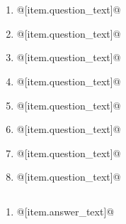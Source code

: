 \documentclass[uplatex,a4j,11pt]{jsarticle}
\begin{document}
\begin{minipage}[t][6cm][t]{\linewidth}
  \section{}
  \begin{multicols}{2}
  \begin{enumerate}
      \item @[item.question\_text]@
      \item @[item.question\_text]@
      \item @[item.question\_text]@
      \item @[item.question\_text]@
      \item @[item.question\_text]@
      \item @[item.question\_text]@
      \item @[item.question\_text]@
      \item @[item.question\_text]@
  \end{enumerate}
  \vfill
  \end{multicols}
\end{minipage}
\newpage

\setcounter{section}{0}
\begin{multicols}{2}
\section{}
\begin{enumerate}
  \item @[item.answer\_text]@
\end{enumerate}
\newpage
\end{multicols}
\end{document}
